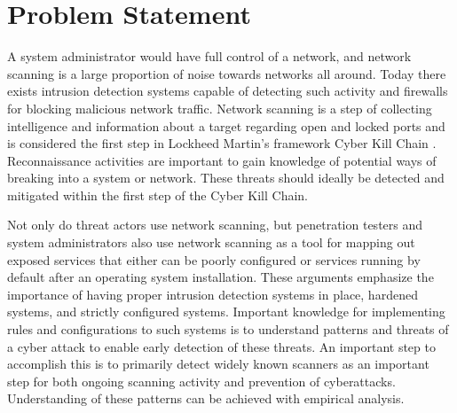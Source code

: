 \section{Problem Statement}

A system administrator would have full control of a network, and network scanning is a large proportion of noise towards networks all around.
Today there exists intrusion detection systems capable of detecting such activity and firewalls for blocking malicious network traffic.
Network scanning is a step of collecting intelligence and information about a target regarding open and locked ports and is considered the first step in Lockheed Martin's framework Cyber Kill Chain \autocite{lockheedmartinCKC}.
Reconnaissance activities are important to gain knowledge of potential ways of breaking into a system or network.
These threats should ideally be detected and mitigated within the first step of the Cyber Kill Chain.

Not only do threat actors use network scanning, but penetration testers and system administrators also use network scanning as a tool for mapping out exposed services that either can be poorly configured or services running by default after an operating system installation.
These arguments emphasize the importance of having proper intrusion detection systems in place, hardened systems, and strictly configured systems.
Important knowledge for implementing rules and configurations to such systems is to understand patterns and threats of a cyber attack to enable early detection of these threats.
An important step to accomplish this is to primarily detect widely known scanners as an important step for both ongoing scanning activity and prevention of cyberattacks.
Understanding of these patterns can be achieved with empirical analysis.

